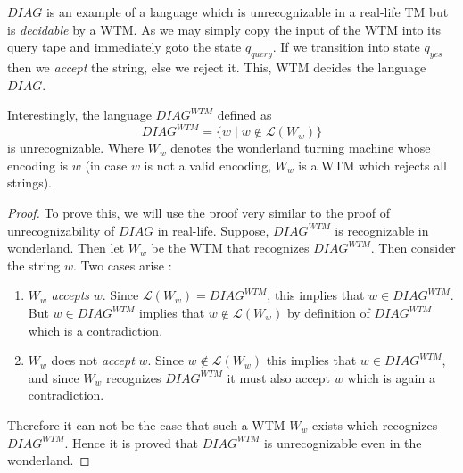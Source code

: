 \begin{soln}
$DIAG$ is an example of a language which is unrecognizable in a real-life TM but is \emph{decidable} by a WTM. As we may simply copy the input of the WTM into its query tape and immediately goto the state $q_{query}$. If we transition into state $q_{yes}$ then we \emph{accept} the string, else we reject it. This, WTM decides the language $DIAG$.

Interestingly, the language $DIAG^{WTM}$ defined as
\[
    DIAG^{WTM} = \{ w \; | \; w \notin \mathcal{L}(W_w) \}
\]
is unrecognizable. Where $W_w$ denotes the wonderland turning machine whose encoding is $w$ (in case $w$ is not a valid encoding, $W_w$ is a WTM which rejects all strings).

\begin{proof}
To prove this, we will use the proof very similar to the proof of unrecognizability of $DIAG$ in real-life.
Suppose, $DIAG^{WTM}$ is recognizable in wonderland. Then let $W_w$ be the WTM that recognizes $DIAG^{WTM}$.
Then consider the string $w$. Two cases arise :
\begin{enumerate}
    \item $W_w$ \emph{accepts} $w$. Since $\mathcal{L}(W_w) = DIAG^{WTM}$, this implies that $w \in DIAG^{WTM}$.
    But $w \in DIAG^{WTM}$ implies that $w \notin \mathcal{L}(W_w)$ by definition of $DIAG^{WTM}$ which is a contradiction.
    
    \item $W_w$ does not \emph{accept} $w$. Since $w \notin \mathcal{L}(W_w)$ this implies that $w \in DIAG^{WTM}$,
    and since $W_w$ recognizes $DIAG^{WTM}$ it must also accept $w$ which is again a contradiction.
\end{enumerate}
Therefore it can not be the case that such a WTM $W_w$ exists which recognizes $DIAG^{WTM}$.
Hence it is proved that $DIAG^{WTM}$ is unrecognizable even in the wonderland.
\end{proof}
\end{soln}